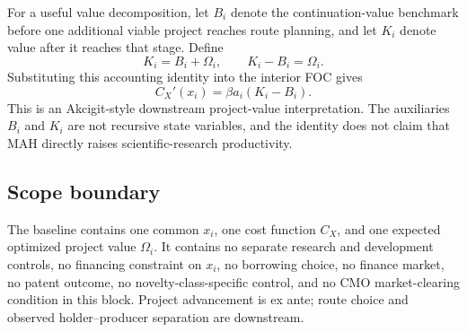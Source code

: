For a useful value decomposition, let \(B_i\) denote the continuation-value
benchmark before one additional viable project reaches route planning, and
let \(K_i\) denote value after it reaches that stage. Define
\begin{equation}
  K_i=B_i+\Omega_i,
  \qquad
  K_i-B_i=\Omega_i.
  \label{eq:p05-value-gap}
\end{equation}
Substituting this accounting identity into the interior FOC gives
\begin{equation}
  C_X'(x_i)
  =
  \beta a_i(K_i-B_i).
  \label{eq:p05-value-gap-foc}
\end{equation}
This is an Akcigit-style downstream project-value interpretation. The
auxiliaries \(B_i\) and \(K_i\) are not recursive state variables, and the
identity does not claim that MAH directly raises scientific-research
productivity.

\subsection{Scope boundary}
\label{subsec:p05-scope}

The baseline contains one common \(x_i\), one cost function \(C_X\), and one
expected optimized project value \(\Omega_i\). It contains no separate
research and development controls, no financing constraint on \(x_i\), no
borrowing choice, no finance market, no patent outcome, no
novelty-class-specific control, and no CMO market-clearing condition in this
block. Project advancement is ex ante; route choice and observed
holder--producer separation are downstream.
